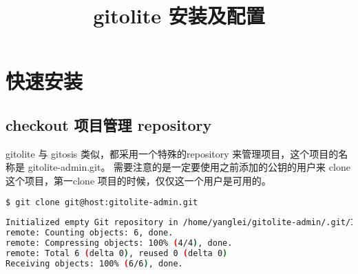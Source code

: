 \documentclass[a4paper,11pt,twoside,openany]{article}
\begin{document}
\title{gitolite 安装及配置}
\maketitle
\section{快速安装}

\subsection{checkout 项目管理 repository}
gitolite 与 gitosis 类似，都采用一个特殊的repository 来管理项目，这个项目的名称是 gitolite-admin.git。 需要注意的是一定要使用之前添加的公钥的用户来 clone 这个项目，第一clone 项目的时候，仅仅这一个用户是可用的。
\begin{lstlisting}[language=bash]
$ git clone git@host:gitolite-admin.git
 
Initialized empty Git repository in /home/yanglei/gitolite-admin/.git/Initialized empty Git repository in /home/yanglei/gitolite-admin/.git/
remote: Counting objects: 6, done.
remote: Compressing objects: 100% (4/4), done.
remote: Total 6 (delta 0), reused 0 (delta 0)
Receiving objects: 100% (6/6), done.
\end{lstlisting}
\end{document}
